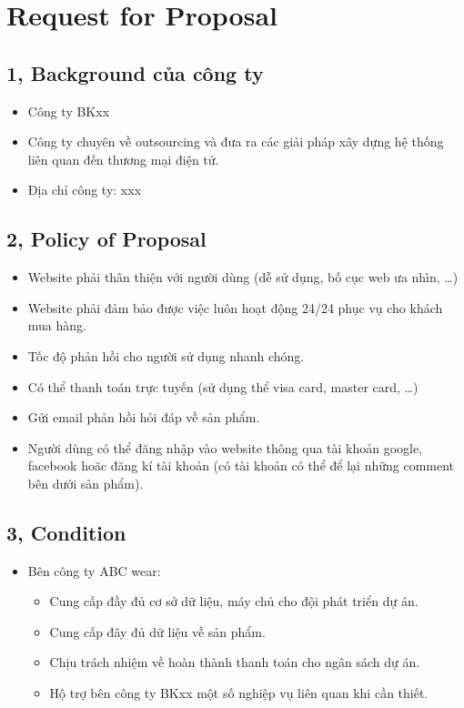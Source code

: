 \documentclass[a4paper,11pt]{report}
\begin{document}
\chapter*{Request for Proposal}
\section*{1, Background của công ty}
\begin{itemize}
\item Công ty BKxx
\item Công ty chuyên về outsourcing và đưa ra các giải pháp xây dựng hệ thống liên quan đến thương mại điện tử.
\item Địa chỉ công ty: xxx
\end{itemize}
\section*{2, Policy of Proposal}
\begin{itemize}
\item Website phải thân thiện với người dùng (dễ sử dụng, bố cục web ưa nhìn, \ldots)
\item Website phải đảm bảo được việc luôn hoạt động 24/24 phục vụ cho khách mua hàng.
\item Tốc độ phản hồi cho người sử dụng nhanh chóng.
\item Có thể thanh toán trực tuyến (sử dụng thể visa card, master card, \ldots )
\item Gửi email phản hồi hỏi đáp về sản phẩm.
\item Người dùng có thể đăng nhập vào website thông qua tài khoản google, facebook hoăc đăng kí tài khoản (có tài khoản có thể để lại những comment bên dưới sản phẩm).
\end{itemize}
\section*{3, Condition}
\begin{itemize}
\item Bên công ty ABC wear:
\begin{itemize}
\item Cung cấp đầy đủ cơ sở dữ liệu, máy chủ cho đội phát triển dự án.
\item Cung cấp đây đủ dữ liệu về sản phẩm.
\item Chịu trách nhiệm về hoàn thành thanh toán cho ngân sách dự án.
\item Hộ trợ bên công ty BKxx một số nghiệp vụ liên quan khi cần thiết.
\end{itemize}
\end{itemize}
\end{document}
